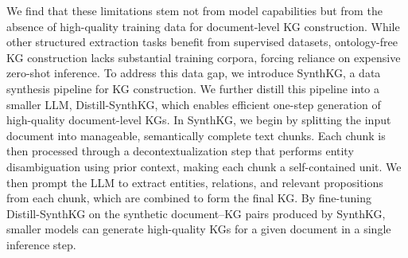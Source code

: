 \documentclass{article} %
\begin{document}
We find that these limitations stem not from model capabilities but from the absence of high-quality training data for document-level KG construction. While other structured extraction tasks benefit from supervised datasets, ontology-free KG construction lacks substantial training corpora, forcing reliance on expensive zero-shot inference.
To address this data gap, we introduce SynthKG, a data synthesis pipeline for KG construction. We further distill this pipeline into a smaller LLM, Distill-SynthKG, which enables efficient one-step generation of high-quality document-level KGs. In SynthKG, we begin by splitting the input document into manageable, semantically complete text chunks. Each chunk is then processed through a decontextualization step that performs entity disambiguation using prior context, making each chunk a self-contained unit. We then prompt the LLM to extract entities, relations, and relevant propositions from each chunk, which are combined to form the final KG. By fine-tuning Distill-SynthKG on the synthetic document–KG pairs produced by SynthKG, smaller models can generate high-quality KGs for a given document in a single inference step.
\end{document}

